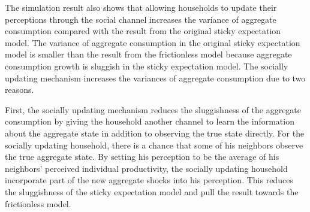 \documentclass[12pt,letterpaper]{article}
\begin{document}
\par
The simulation result also shows that allowing households to update their perceptions through the social channel increases the variance of aggregate consumption compared with the result from the original sticky expectation model. The variance of aggregate consumption in the original sticky expectation model is smaller than the result from the frictionless model because aggregate consumption growth is sluggish in the sticky expectation model. The socially updating mechanism increases the variances of aggregate consumption due to two reasons.\par
First, the socially updating mechanism reduces the sluggishness of the aggregate consumption by giving the household another channel to learn the information about the aggregate state in addition to observing the true state directly. For the socially updating household, there is a chance that some of his neighbors observe the true aggregate state. By setting his perception to be the average of his neighbors' perceived individual productivity, the socially updating household incorporate part of the new aggregate shocks into his perception. This reduces the sluggishness of the sticky expectation model and pull the result towards the frictionless model.\par
\end{document}
